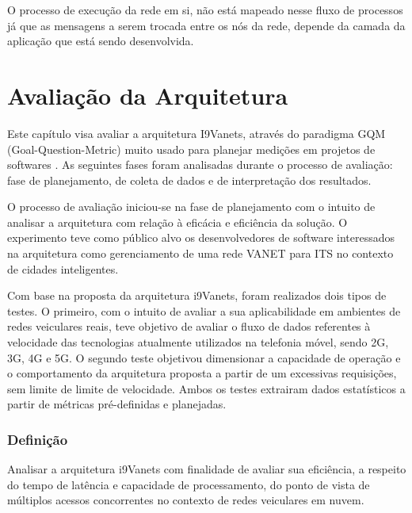 \documentclass[
	12pt,				%
	oneside,			%
	a4paper,			%
	english,			%
	brazil				%
	]{abntex2ppgsi}
\begin{document}
O processo de execução da rede em si, não está mapeado nesse fluxo de processos já que as mensagens a serem trocada entre os nós da rede, depende da camada da aplicação que está sendo desenvolvida.

\chapter{Avaliação da Arquitetura}\label{sec:avaliacaoArquitetura}


Este capítulo visa avaliar a arquitetura I9Vanets,  através do paradigma GQM (Goal-Question-Metric) muito usado para planejar medições em projetos de softwares \cite{van2002goal}. As seguintes fases foram analisadas durante o processo de avaliação: fase de planejamento, de coleta de dados e de interpretação dos resultados.

O processo de avaliação iniciou-se na fase de planejamento com o intuito de analisar a arquitetura com relação à eficácia e eficiência da solução. O experimento teve como público alvo os desenvolvedores de software interessados na arquitetura como gerenciamento de uma rede VANET para ITS no contexto de cidades inteligentes.

Com base na proposta da arquitetura i9Vanets, foram realizados dois tipos de testes. O primeiro, com o intuito de avaliar a sua aplicabilidade em ambientes de redes veiculares reais, teve objetivo de avaliar o fluxo de dados referentes à velocidade das tecnologias atualmente utilizados na telefonia móvel, sendo 2G, 3G, 4G e 5G. O segundo teste objetivou dimensionar a capacidade de operação e o comportamento da arquitetura proposta a partir de um excessivas requisições, sem limite de limite de velocidade. Ambos os testes extrairam dados estatísticos a partir de métricas pré-definidas e planejadas.

\subsection{Definição}

Analisar a arquitetura i9Vanets com finalidade de avaliar sua eficiência, a respeito do tempo de latência e capacidade de processamento, do ponto de vista de múltiplos acessos concorrentes no contexto de redes veiculares em nuvem.
\end{document}
